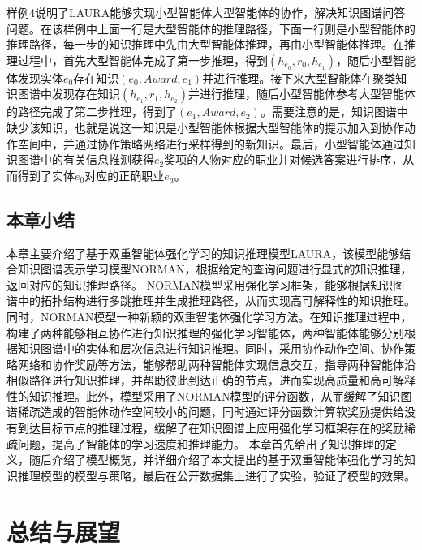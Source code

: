\documentclass[algorithmlist, AutoFakeBold, AutoFakeSlant, figurelist, tablelist, nomlist, engineering]{seuthesix}
\begin{document}
样例4说明了LAURA能够实现小型智能体大型智能体的协作，解决知识图谱问答问题。在该样例中上面一行是大型智能体的推理路径，下面一行则是小型智能体的推理路径，每一步的知识推理中先由大型智能体推理，再由小型智能体推理。在推理过程中，首先大型智能体完成了第一步推理，得到$(h_{e_0}, r_0, h_{e_1})$，随后小型智能体发现实体$e_0$存在知识$(e_0, Award, e_1)$并进行推理。接下来大型智能体在聚类知识图谱中发现存在知识$(h_{e_1}, r_1, h_{e_2})$并进行推理，随后小型智能体参考大型智能体的路径完成了第二步推理，得到了$(e_1, Award, e_2)$。需要注意的是，知识图谱中缺少该知识，也就是说这一知识是小型智能体根据大型智能体的提示加入到协作动作空间中，并通过协作策略网络进行采样得到的新知识。最后，小型智能体通过知识图谱中的有关信息推测获得$e_2$奖项的人物对应的职业并对候选答案进行排序，从而得到了实体$e_0$对应的正确职业$e_a$。

\section{本章小结}
本章主要介绍了基于双重智能体强化学习的知识推理模型LAURA，该模型能够结合知识图谱表示学习模型NORMAN，根据给定的查询问题进行显式的知识推理，返回对应的知识推理路径。
NORMAN模型采用强化学习框架，能够根据知识图谱中的拓扑结构进行多跳推理并生成推理路径，从而实现高可解释性的知识推理。同时，NORMAN模型一种新颖的双重智能体强化学习方法。在知识推理过程中，构建了两种能够相互协作进行知识推理的强化学习智能体，两种智能体能够分别根据知识图谱中的实体和层次信息进行知识推理。同时，采用协作动作空间、协作策略网络和协作奖励等方法，能够帮助两种智能体实现信息交互，指导两种智能体沿相似路径进行知识推理，并帮助彼此到达正确的节点，进而实现高质量和高可解释性的知识推理。此外，模型采用了NORMAN模型的评分函数，从而缓解了知识图谱稀疏造成的智能体动作空间较小的问题，同时通过评分函数计算软奖励提供给没有到达目标节点的推理过程，缓解了在知识图谱上应用强化学习框架存在的奖励稀疏问题，提高了智能体的学习速度和推理能力。
本章首先给出了知识推理的定义，随后介绍了模型概览，并详细介绍了本文提出的基于双重智能体强化学习的知识推理模型的模型与策略，最后在公开数据集上进行了实验，验证了模型的效果。


\chapter{总结与展望}
\end{document}
